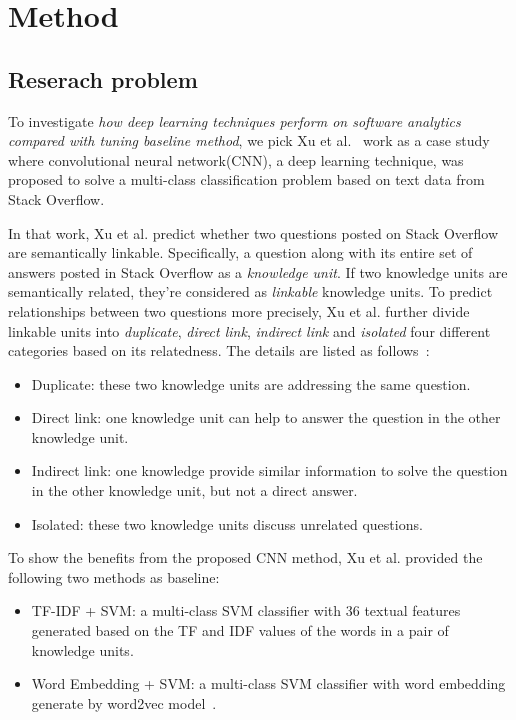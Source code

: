 \section{Method}

\subsection{Reserach problem}
To investigate {\it how deep learning techniques perform on software analytics compared 
with tuning baseline method}, we pick Xu et al.~\cite{xu2016predicting} work as a case study
where convolutional neural network(CNN), a deep learning technique, was proposed to 
solve a multi-class classification problem based on text data from Stack Overflow.

In that work, Xu et al. predict whether two questions posted on Stack Overflow are semantically linkable. 
Specifically,  a question along with its entire set of answers posted in Stack Overflow
as a {\it knowledge unit}. If two knowledge units are semantically related, they're considered
as {\it linkable} knowledge units. To predict relationships between two questions more precisely, 
Xu et al. further divide linkable  units 
into {\it duplicate}, {\it direct link}, {\it indirect link} and {\it isolated}  four different categories 
based on its relatedness. The details are listed as follows~\cite{xu2016predicting}:

\begin{itemize}
\item Duplicate:  these two knowledge units are addressing the same question.
\item Direct link: one knowledge unit can help to answer the question in the other knowledge unit.
\item Indirect link: one knowledge provide similar information to solve the question in the other knowledge unit, but not a direct answer.
\item Isolated: these two knowledge units discuss unrelated questions.
\end{itemize}

To show the benefits from the proposed CNN method, Xu et al. provided the following two methods as baseline:

\begin{itemize}
\item TF-IDF + SVM: a multi-class SVM classifier with  36 textual features generated  based on the 
TF and IDF values of the words in a pair of knowledge units. 
\item Word Embedding + SVM:  a multi-class SVM classifier with word embedding generate by word2vec model~\cite{mikolov2013distributed}.
\end{itemize}


